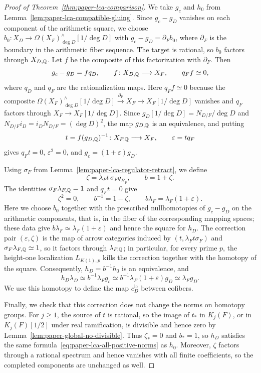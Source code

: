 \begin{proof}[Proof of Theorem~\ref{thm:paper-lca-comparison}]
We take $g_c$ and $h_0$ from Lemma~\ref{lem:paper-lca-compatible-gluing}.
Since $g_c-g_D$ vanishes on each component of the arithmetic square, we choose $b_0\colon X_D\to\Omega (X_F)^\wedge_{\deg D}[1/\deg D]$ with $g_c-g_D=\partial_F b_0$, where $\partial_F$ is the boundary in the arithmetic fiber sequence.
The target is rational, so $b_0$ factors through $X_{D,\mathbb Q}$.
Let $f$ be the composite of this factorization with $\partial_F$.
Then
\[
 g_c-g_D=fq_D,\qquad
 f\colon X_{D,\mathbb Q}\longrightarrow X_F,\qquad q_Ff\simeq0,
\]
where $q_D$ and $q_F$ are the rationalization maps.
Here $q_Ff\simeq0$ because the composite $\Omega (X_F)^\wedge_{\deg D}[1/\deg D]\xrightarrow{\partial_F}X_F\to X_F[1/\deg D]$ vanishes and $q_F$ factors through $X_F\to X_F[1/\deg D]$.
Since $g_D[1/\deg D]=N_{D/F}/\deg D$ and $N_{D/F}i_D=i_DN_{D/F}=(\deg D)^2$, the map $g_{D,\mathbb Q}$ is an equivalence, and putting
\[
 t=f(g_{D,\mathbb Q})^{-1}\colon X_{F,\mathbb Q}\longrightarrow X_F,
 \qquad \varepsilon=tq_F
\]
gives $q_Ft=0$, $\varepsilon^2=0$, and $g_c=(1+\varepsilon)g_D$.

Using $\sigma_F$ from Lemma~\ref{lem:paper-lca-regulator-retract}, we define
\[
 \zeta=\lambda_Ft\,\sigma_Fq_{B_F},\qquad b=1+\zeta.
\]
The identities $\sigma_F\lambda_{F,\mathbb Q}=1$ and $q_Ft=0$ give
\[
 \zeta^2=0,\qquad
 b^{-1}=1-\zeta,\qquad
 b\lambda_F=\lambda_F(1+\varepsilon).
\]
Here we choose $b_0$ together with the prescribed nullhomotopies of $g_c-g_D$ on the arithmetic components, that is, in the fiber of the corresponding mapping spaces; these data give $b\lambda_F\simeq\lambda_F(1+\varepsilon)$ and hence the square for $h_D$.
The correction pair $(\varepsilon,\zeta)$ is the map of arrow categories induced by $(t,\lambda_Ft\sigma_F)$ and $\sigma_F\lambda_{F,\mathbb Q}\simeq1$, so it factors through $\lambda_{F,\mathbb Q}$; in particular, for every prime $p$, the height-one localization $L_{K(1),p}$ kills the correction together with the homotopy of the square.
Consequently, $h_D=b^{-1}h_0$ is an equivalence, and
\[
 h_D\lambda_D\simeq b^{-1}\lambda_Fg_c
 \simeq b^{-1}\lambda_F(1+\varepsilon)g_D
 \simeq\lambda_Fg_D.
\]
We use this homotopy to define the map $c^{\mathrm{lc}}_D$ between cofibers.

Finally, we check that this correction does not change the norms on homotopy groups.
For $j\ge1$, the source of $t$ is rational, so the image of $t_*$ in $K_j(F)$, or in $K_j(F)[1/2]$ under real ramification, is divisible and hence zero by Lemma~\ref{lem:paper-global-no-divisible}.
Thus $\zeta_*=0$ and $b_*=1$, so $h_D$ satisfies the same formula~\eqref{eq:paper-lca-all-positive-norms} as $h_0$.
Moreover, $\zeta$ factors through a rational spectrum and hence vanishes with all finite coefficients, so the completed components are unchanged as well.
\end{proof}

